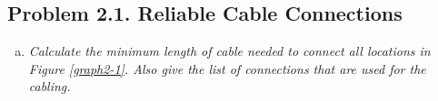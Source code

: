 \subsection{Problem 2.1. Reliable Cable Connections}
\begin{enumerate}[(a)]
\item \emph{Calculate the minimum length of cable needed to connect all locations in Figure
\ref{graph2-1}. Also give the list of connections that are used for the cabling.}
\end{enumerate}

\paragraph{}
	